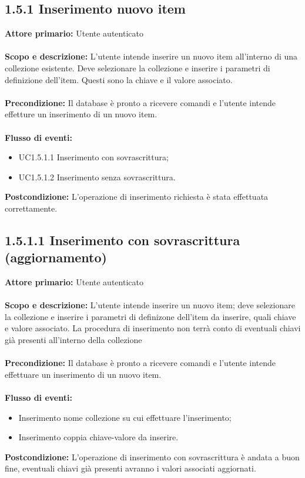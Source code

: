 \documentclass{scalatekids-article}
\begin{document}
\subsection{1.5.1 Inserimento nuovo item}
\textbf{Attore primario:} Utente autenticato\\ \\
\textbf{Scopo e descrizione:} L'utente intende inserire un nuovo item all'interno di una collezione esistente. Deve selezionare la collezione e inserire i parametri di definizione dell'item. Questi sono la chiave e il valore associato.\\ \\
\textbf{Precondizione:} Il database è pronto a ricevere comandi e l'utente intende effetture un inserimento di un nuovo item.\\ \\
\textbf{Flusso di eventi:}
\begin{itemize}
\item UC1.5.1.1 Inserimento con sovrascrittura;
\item UC1.5.1.2 Inserimento senza sovrascrittura.
\end{itemize}
\textbf{Postcondizione:} L'operazione di inserimento richiesta è stata effettuata correttamente.
\subsection{1.5.1.1 Inserimento con sovrascrittura (aggiornamento)}
\textbf{Attore primario:} Utente autenticato\\ \\
\textbf{Scopo e descrizione:} L'utente intende inserire un nuovo item; deve selezionare la collezione e inserire i parametri di definizone dell'item da inserire, quali chiave e valore associato. La procedura di inserimento non terrà conto di
eventuali chiavi già presenti all'interno della collezione\\ \\
\textbf{Precondizione:} Il database è pronto a ricevere comandi e l'utente intende effettuare un inserimento di un nuovo item.\\ \\
\textbf{Flusso di eventi:}
\begin{itemize}
\item Inserimento nome collezione su cui effettuare l'inserimento;
\item Inserimento coppia chiave-valore da inserire.
\end{itemize}
\textbf{Postcondizione:} L'operazione di inserimento con sovrascrittura è andata a buon fine, eventuali chiavi già presenti avranno i valori associati aggiornati.
\end{document}
